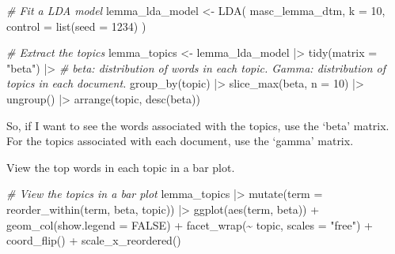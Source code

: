 \documentclass[
  letterpaper,
  DIV=11,
  numbers=noendperiod]{scrreport}
\newenvironment{Shaded}{\begin{snugshade}}{\end{snugshade}}
\newcommand{\AttributeTok}[1]{\textcolor[rgb]{0.00,0.00,0.00}{#1}}
\newcommand{\CommentTok}[1]{\textcolor[rgb]{0.00,0.00,0.00}{\textit{#1}}}
\newcommand{\ConstantTok}[1]{\textcolor[rgb]{0.00,0.00,0.00}{#1}}
\newcommand{\DecValTok}[1]{\textcolor[rgb]{0.00,0.00,0.00}{#1}}
\newcommand{\FunctionTok}[1]{\textcolor[rgb]{0.00,0.00,0.00}{#1}}
\newcommand{\NormalTok}[1]{\textcolor[rgb]{0.00,0.00,0.00}{#1}}
\newcommand{\OtherTok}[1]{\textcolor[rgb]{0.00,0.00,0.00}{#1}}
\newcommand{\SpecialCharTok}[1]{\textcolor[rgb]{0.00,0.00,0.00}{#1}}
\newcommand{\StringTok}[1]{\textcolor[rgb]{0.00,0.00,0.00}{#1}}
\theoremstyle{definition}
\theoremstyle{remark}
\begin{document}
\begin{Shaded}
\begin{Highlighting}[]
\CommentTok{\# Fit a LDA model}
\NormalTok{lemma\_lda\_model }\OtherTok{\textless{}{-}} 
  \FunctionTok{LDA}\NormalTok{(}
\NormalTok{    masc\_lemma\_dtm,}
    \AttributeTok{k =} \DecValTok{10}\NormalTok{,}
    \AttributeTok{control =} \FunctionTok{list}\NormalTok{(}\AttributeTok{seed =} \DecValTok{1234}\NormalTok{)}
\NormalTok{  )}

\CommentTok{\# Extract the topics}
\NormalTok{lemma\_topics }\OtherTok{\textless{}{-}} 
\NormalTok{  lemma\_lda\_model }\SpecialCharTok{|\textgreater{}} 
  \FunctionTok{tidy}\NormalTok{(}\AttributeTok{matrix =} \StringTok{"beta"}\NormalTok{) }\SpecialCharTok{|\textgreater{}} \CommentTok{\# beta: distribution of words in each topic. Gamma: distribution of topics in each document.}
  \FunctionTok{group\_by}\NormalTok{(topic) }\SpecialCharTok{|\textgreater{}}
  \FunctionTok{slice\_max}\NormalTok{(beta, }\AttributeTok{n =} \DecValTok{10}\NormalTok{) }\SpecialCharTok{|\textgreater{}}
  \FunctionTok{ungroup}\NormalTok{() }\SpecialCharTok{|\textgreater{}}
  \FunctionTok{arrange}\NormalTok{(topic, }\FunctionTok{desc}\NormalTok{(beta))}
\end{Highlighting}
\end{Shaded}

So, if I want to see the words associated with the topics, use the
`beta' matrix. For the topics associated with each document, use the
`gamma' matrix.

View the top words in each topic in a bar plot.

\begin{Shaded}
\begin{Highlighting}[]
\CommentTok{\# View the topics in a bar plot}
\NormalTok{lemma\_topics }\SpecialCharTok{|\textgreater{}} 
  \FunctionTok{mutate}\NormalTok{(}\AttributeTok{term =} \FunctionTok{reorder\_within}\NormalTok{(term, beta, topic)) }\SpecialCharTok{|\textgreater{}} 
  \FunctionTok{ggplot}\NormalTok{(}\FunctionTok{aes}\NormalTok{(term, beta)) }\SpecialCharTok{+}
  \FunctionTok{geom\_col}\NormalTok{(}\AttributeTok{show.legend =} \ConstantTok{FALSE}\NormalTok{) }\SpecialCharTok{+}
  \FunctionTok{facet\_wrap}\NormalTok{(}\SpecialCharTok{\textasciitilde{}}\NormalTok{ topic, }\AttributeTok{scales =} \StringTok{"free"}\NormalTok{) }\SpecialCharTok{+}
  \FunctionTok{coord\_flip}\NormalTok{() }\SpecialCharTok{+}
  \FunctionTok{scale\_x\_reordered}\NormalTok{()}
\end{Highlighting}
\end{Shaded}
\end{document}
